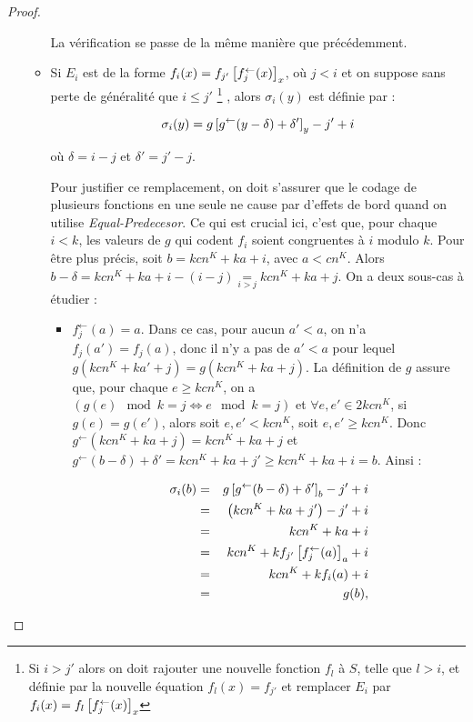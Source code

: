 \begin{proof}
\begin{enumerate}[itemsep=-1mm,leftmargin=2cm]
\begin{itemize}[itemsep=-1mm, leftmargin=1cm]
							La vérification se passe de la même manière que précédemment.
							
						\item
							Si $E_i$ est de la forme $f_i(x) = f_{j'}\left[ f_j^{\leftarrow}(x) \right]_{x}$, où $j < i$ et on suppose sans perte de généralité que $i \leqslant j'$ 
								\footnote{Si $i > j'$ alors on doit rajouter une nouvelle fonction $f_l$ à $S$, telle que $l > i$, et définie par la nouvelle équation $f_l(x) = f_{j'}$ et remplacer $E_i$ par $f_i(x) = f_{l}\left[ f_j^{\leftarrow}(x) \right]_{x}$}
							, alors $\sigma_i(y)$ est définie par :
							
							\[
								\sigma_i(y) = g\left[ g^{\leftarrow}(y-\delta)  + \delta' \right]_{y} - j' + i
							\]
							
							où $\delta = i - j$ et $\delta' = j' - j$.
							
							Pour justifier ce remplacement, on doit s'assurer que le codage de plusieurs fonctions en une seule ne cause par d'effets de bord quand on utilise \emph{Equal-Predecesor}. Ce qui est crucial ici, c'est que, pour chaque $i<k$, les valeurs de $g$ qui codent $f_i$ soient congruentes à $i$ modulo $k$. Pour être plus précis, soit $b = kcn^K + ka + i$, avec $a< cn^K$. Alors $b-\delta = kcn^K + ka + i - (i - j) \underset{i>j}{=} kcn^K + ka + j$. On a deux sous-cas à étudier :
							
							\begin{itemize}[itemsep=-1mm,leftmargin=1cm]
								\item
									$f_j^{\leftarrow}(a) = a$.   Dans ce cas, pour aucun $a' < a$, on n'a $f_j(a') = f_j(a)$, donc il n'y a pas de $a' < a$ pour lequel $g\left( kcn^K + ka' + j \right) = g\left( kcn^K + ka + j \right)$. La définition de $g$ assure que, pour chaque $e \geqslant kcn^K$, on a $\left(g(e) \mod{k} = j \Leftrightarrow e \mod{k} = j\right)$ et $\forall e, e' \in 2kcn^K$, si $g(e) = g(e')$, alors soit $e, e' < kcn^K$, soit $e, e' \geqslant kcn^K$. Donc $g^{\leftarrow} \left( kcn^K + ka + j \right) = kcn^K + ka + j$ et $g^{\leftarrow}\left( b - \delta \right) + \delta' = kcn^K + ka + j' \geqslant kcn^K + ka + i = b$. Ainsi :
									
									\setcounter{equation}{0}
									\begin{eqnarray}
										\sigma_i(b) 	& = &	g\left[ g^{\leftarrow}(b-\delta) +\delta' \right]_{b} - j' + i \\
														& = & 	\left( kcn^K + ka + j' \right) - j' + i \\
														& = & 	kcn^K + ka + i \\
														& = & 	kcn^K + k f_{j'}\left[ f_j^{\leftarrow}(a) \right]_{a} + i \\
														& = & 	kcn^K + k f_i(a) + i \\
														& = & 	g(b),
									\end{eqnarray}
									

\end{itemize}
\end{itemize}
\end{enumerate}
\end{proof}
